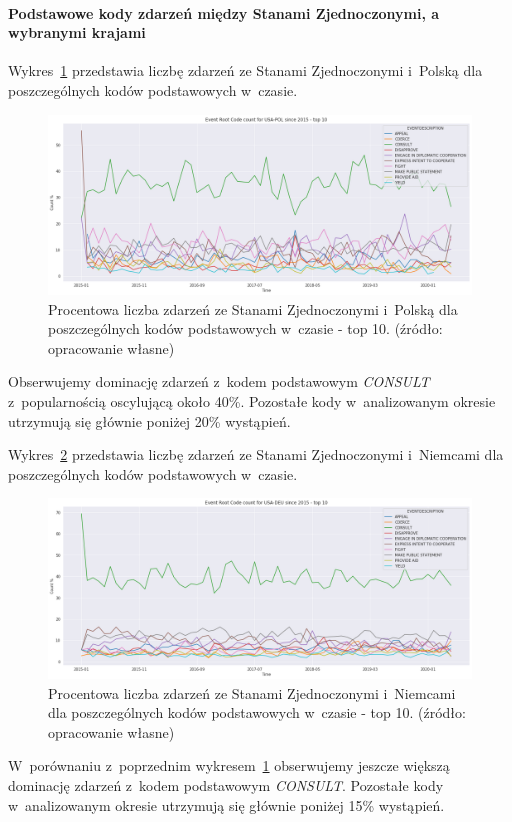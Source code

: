 \documentclass[11pt]{report}
\begin{document}
    \paragraph{Podstawowe kody zdarzeń między Stanami Zjednoczonymi, a wybranymi krajami}

    Wykres~\ref{fig:USAPOLERC} przedstawia liczbę zdarzeń ze Stanami Zjednoczonymi i~Polską dla poszczególnych kodów podstawowych w~czasie.
    \begin{figure}[!htp]
        \centering
        \includegraphics[width=\linewidth]{fig/USA/USAPOLERCperc.png}
        \caption{Procentowa liczba zdarzeń ze Stanami Zjednoczonymi i~Polską dla poszczególnych kodów podstawowych w~czasie - top 10. (źródło: opracowanie własne)}
        \label{fig:USAPOLERC}
    \end{figure}
    Obserwujemy dominację zdarzeń z~kodem podstawowym \textit{CONSULT} z~popularnością oscylującą około 40\%.
    Pozostałe kody w~analizowanym okresie utrzymują się głównie poniżej 20\% wystąpień.

    Wykres~\ref{fig:USADEUERC} przedstawia liczbę zdarzeń ze Stanami Zjednoczonymi i~Niemcami dla poszczególnych kodów podstawowych w~czasie.
    \begin{figure}[!htp]
        \centering
        \includegraphics[width=\linewidth]{fig/USA/USADEUERCperc.png}
        \caption{Procentowa liczba zdarzeń ze Stanami Zjednoczonymi i~Niemcami dla poszczególnych kodów podstawowych w~czasie - top 10. (źródło: opracowanie własne)}
        \label{fig:USADEUERC}
    \end{figure}
    W~porównaniu z~poprzednim wykresem~\ref{fig:USAPOLERC} obserwujemy jeszcze większą dominację zdarzeń z~kodem podstawowym \textit{CONSULT}.
    Pozostałe kody w~analizowanym okresie utrzymują się głównie poniżej 15\% wystąpień.
\end{document}
